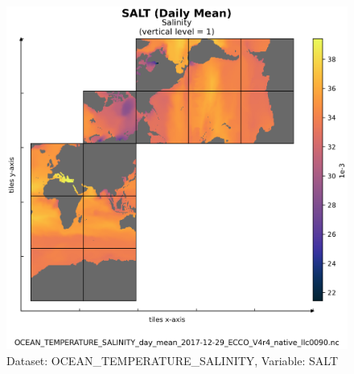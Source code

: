 \begin{figure}[H]
\centering
\includegraphics[scale=0.55]{../images/plots/v4r4/native_plots/Ocean_Temperature_and_Salinity/SALT.png}
\caption{Dataset: OCEAN\_TEMPERATURE\_SALINITY, Variable: SALT}
\label{tab:table-OCEAN_TEMPERATURE_SALINITY_SALT-Plot}
\end{figure}
\newpage
\pagebreak
